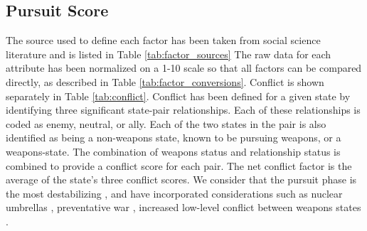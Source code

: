 \subsection{Pursuit Score}\label{s_pe}
The source used to define each factor has been taken from social science literature and is listed in Table \ref{tab:factor_sources} The raw data for each attribute has been normalized on a 1-10 scale so that all factors can be compared directly, as described in Table \ref{tab:factor_conversions}. Conflict is shown separately in Table \ref{tab:conflict}. Conflict has been defined for a given state by identifying three significant state-pair relationships.  Each of these relationships is coded as enemy, neutral, or ally.  Each of the two states in the pair is also identified as being a non-weapons state, known to be pursuing weapons, or a weapons-state.  The combination of weapons status and relationship status is combined to provide a conflict score for each pair. The net conflict factor is the average of the state's three conflict scores. We consider that the pursuit phase is the most destabilizing , and have incorporated considerations such as nuclear umbrellas ,  preventative war , increased low-level conflict between weapons states .

